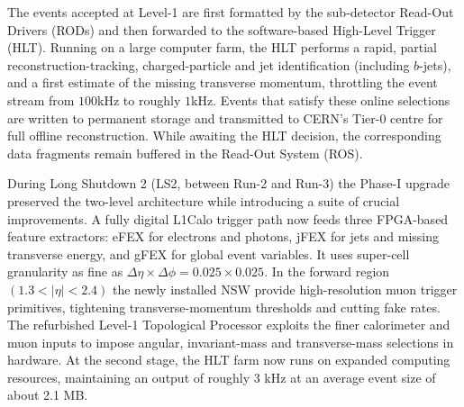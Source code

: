 The events accepted at Level-1 are first formatted by the sub-detector Read-Out Drivers (RODs) and then forwarded to the software-based High-Level Trigger (HLT). Running on a large computer farm, the HLT performs a rapid, partial reconstruction-tracking, charged-particle and jet identification (including $b$-jets), and a first estimate of the missing transverse momentum, throttling the event stream from $100$kHz to roughly $1$kHz. Events that satisfy these online selections are written to permanent storage and transmitted to CERN’s Tier-0 centre for full offline reconstruction. While awaiting the HLT decision, the corresponding data fragments remain buffered in the Read-Out System (ROS).

During Long Shutdown 2 (LS2, between Run-2 and Run-3) the Phase-I upgrade preserved the two-level architecture while introducing a suite of crucial improvements. A fully digital L1Calo trigger path now feeds three FPGA-based feature extractors: eFEX for electrons and photons, jFEX for jets and missing transverse energy, and gFEX for global event variables. It uses super-cell granularity as fine as $\Delta\eta\times\Delta\phi = 0.025\times0.025$. In the forward region $(1.3<|\eta|<2.4)$ the newly installed NSW provide high-resolution muon trigger primitives, tightening transverse-momentum thresholds and cutting fake rates. The refurbished Level-1 Topological Processor exploits the finer calorimeter and muon inputs to impose angular, invariant-mass and transverse-mass selections in hardware. At the second stage, the HLT farm now runs on expanded computing resources, maintaining an output of roughly 3 kHz at an average event size of about 2.1 MB.



